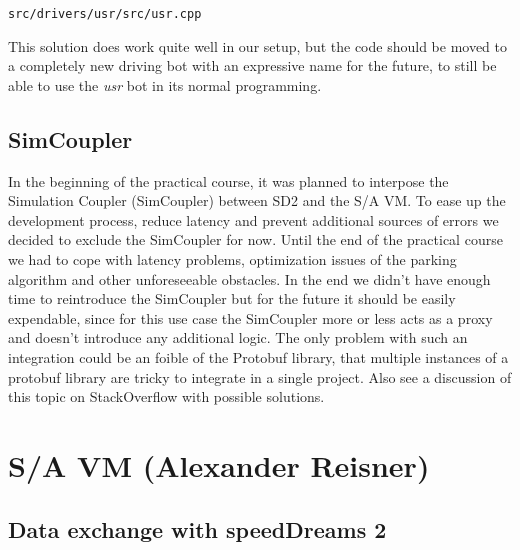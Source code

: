 \documentclass[paper=a4, fontsize=11pt]{scrreprt}
\begin{document}
\begin{listing}[ht]
  \inputminted[firstline=751,linenos=true,lastline=755,gobble=4]{c++}{../../../simulators/speed-dreams/src/drivers/usr/src/usr.cpp}
  \caption{\texttt{src/drivers/usr/src/usr.cpp}}\label{aw_parked}
\end{listing}

This solution does work quite well in our setup,
but the code should be moved to a completely new driving bot with an expressive name for the future,
to still be able to use the \textit{usr} bot in its normal programming.

\section{SimCoupler}
In the beginning of the practical course,
it was planned to interpose the Simulation Coupler (SimCoupler) between SD2 and the S/A VM.
To ease up the development process, reduce latency and
prevent additional sources of errors we decided to exclude the SimCoupler for now.
Until the end of the practical course we had to cope with latency problems,
optimization issues of the parking algorithm and other unforeseeable obstacles.
In the end we didn't have enough time to reintroduce the SimCoupler
but for the future it should be easily expendable,
since for this use case the SimCoupler more or less acts as a proxy
and doesn't introduce any additional logic.
The only problem with such an integration could be an foible of the Protobuf library,
that multiple instances of a protobuf library are tricky to integrate in a single project.
Also see a discussion of this topic on StackOverflow \cite{soprotobuf} with possible solutions.

\chapter{S/A VM (Alexander Reisner)}
\section{Data exchange with speedDreams 2}
\end{document}
